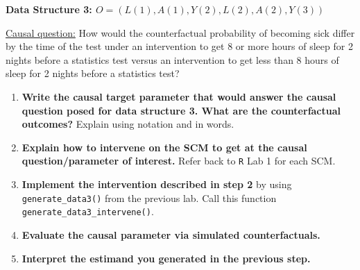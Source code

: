 \documentclass[answers]{exam}
\begin{document}
\noindent\large\textbf{Data Structure 3: $O = (L(1), A(1), Y(2), L(2), A(2), Y(3))$}

\normalsize

\noindent\underline{Causal question:} How would the counterfactual probability of becoming sick differ by the time of the test under an intervention to get 8 or more hours of sleep for 2 nights before a statistics test versus an intervention to get less than 8 hours of sleep for 2 nights before a statistics test?

\begin{enumerate}
\item \textbf{Write the causal target parameter that would answer the causal question posed for data structure 3. What are the counterfactual outcomes?} Explain using notation and in words.
\item \textbf{Explain how to intervene on the SCM to get at the causal question/parameter of interest.} Refer back to \texttt{R} Lab 1 for each SCM.
\item \textbf{Implement the intervention described in step 2} by using \texttt{generate\_data3()} from the previous lab. Call this function \texttt{generate\_data3\_intervene()}.
\item \textbf{Evaluate the causal parameter via simulated counterfactuals.}
\item \textbf{Interpret the estimand you generated in the previous step.}
\end{enumerate}
\end{document}
